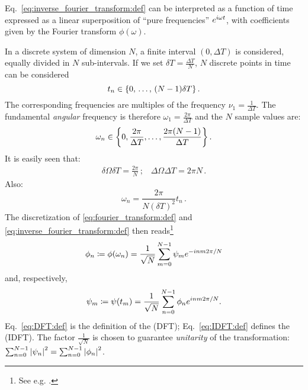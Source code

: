 Eq.~\eqref{eq:inverse_fourier_transform:def} can be interpreted
as a function of time
expressed as a linear superposition
of ``pure frequencies'' $e^{i \omega t}$,
with coefficients given by the Fourier transform $\phi(\omega)$.

In a discrete system of dimension $N$, a finite interval $(0, \Delta{T})$ is considered,
equally divided in $N$ sub-intervals. If we set $\delta{T} = \frac{\Delta{T}}{N}$,
$N$ discrete points in time can be considered
\begin{equation}\label{eq:DFT:t_spectrum}
  t_n \in \left\{0,\,\hdots,\,(N-1)\delta{T}\right\} \text{.}
\end{equation}
%
The corresponding frequencies are multiples of the  frequency $\nu_1 = \frac{1}{\Delta{T}}$.
The fundamental \emph{angular} frequency is therefore $\omega_1 = \frac{2\pi}{\Delta{T}}$ and the
$N$ sample values are:
\begin{equation}\label{eq:DFT:omega_spectrum}
  \omega_n \in \left\{0, \frac{2\pi}{\Delta{T}}, \dots, \frac{2\pi(N-1)}{\Delta{T}}\right\} \text{.}
\end{equation}
%
It is easily seen that:
\begin{gather}\label{eq:DFT:deltas}
  \delta\Omega \delta T = \frac{2\pi}{N} \, \text{;} \quad
  \Delta\Omega \Delta T = 2\pi N \, \text{.}
\end{gather}
Also:
\begin{equation}\label{eq:DFT:eigenratio}
  \omega_{n} = \frac{2\pi}{N(\delta{T})^{2}} t_{n}  \, \text{.}
\end{equation}
%
The discretization
of \eqref{eq:fourier_transform:def} and \eqref{eq:inverse_fourier_transform:def}
then reads\footnote{
  See e.g.
  \cite{Oppenheim:Int1,Oppenheim:Int3,ProakisManolakis}.
}
\begin{equation}\label{eq:DFT:def}
  \phi_n \coloneqq \phi(\omega_n) = \frac{1}{\sqrt{N}} \sum_{m=0}^{N-1} \psi_m e^{-i n m 2 \pi / N}
\end{equation}
and, respectively,
\begin{equation}\label{eq:IDFT:def}
  \psi_m \coloneqq \psi(t_m) = \frac{1}{\sqrt{N}} \sum_{n=0}^{N-1} \phi_n e^{i n m 2 \pi / N} \text{.}
\end{equation}
%
Eq.~\eqref{eq:DFT:def} is the definition of the  (DFT);
Eq.~\eqref{eq:IDFT:def} defines the  (IDFT).
%
The factor $\frac{1}{\sqrt{N}}$
is chosen to guarantee \emph{unitarity} of the transformation:
$\sum_{n=0}^{N-1} \abs{\psi_n}^2 = \sum_{n=0}^{N-1} \abs{\phi_n}^2$.

